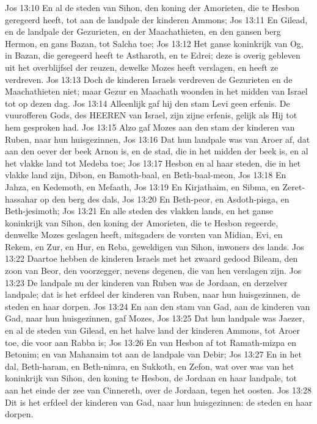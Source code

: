 Jos 13:10  En al de steden van Sihon, den koning der Amorieten, die te Hesbon geregeerd heeft, tot aan de landpale der kinderen Ammons;
Jos 13:11  En Gilead, en de landpale der Gezurieten, en der Maachathieten, en den gansen berg Hermon, en gans Bazan, tot Salcha toe;
Jos 13:12  Het ganse koninkrijk van Og, in Bazan, die geregeerd heeft te Astharoth, en te Edrei; deze is overig gebleven uit het overblijfsel der reuzen, dewelke Mozes heeft verslagen, en heeft ze verdreven.
Jos 13:13  Doch de kinderen Israels verdreven de Gezurieten en de Maachathieten niet; maar Gezur en Maachath woonden in het midden van Israel tot op dezen dag.
Jos 13:14  Alleenlijk gaf hij den stam Levi geen erfenis. De vuurofferen Gods, des HEEREN van Israel, zijn zijne erfenis, gelijk als Hij tot hem gesproken had.
Jos 13:15  Alzo gaf Mozes aan den stam der kinderen van Ruben, naar hun huisgezinnen,
Jos 13:16  Dat hun landpale was van Aroer af, dat aan den oever der beek Arnon is, en de stad, die in het midden der beek is, en al het vlakke land tot Medeba toe;
Jos 13:17  Hesbon en al haar steden, die in het vlakke land zijn, Dibon, en Bamoth-baal, en Beth-baal-meon,
Jos 13:18  En Jahza, en Kedemoth, en Mefaath,
Jos 13:19  En Kirjathaim, en Sibma, en Zeret-hassahar op den berg des dals,
Jos 13:20  En Beth-peor, en Asdoth-pisga, en Beth-jesimoth;
Jos 13:21  En alle steden des vlakken lands, en het ganse koninkrijk van Sihon, den koning der Amorieten, die te Hesbon regeerde, denwelke Mozes geslagen heeft, mitsgaders de vorsten van Midian, Evi, en Rekem, en Zur, en Hur, en Reba, geweldigen van Sihon, inwoners des lands.
Jos 13:22  Daartoe hebben de kinderen Israels met het zwaard gedood Bileam, den zoon van Beor, den voorzegger, nevens degenen, die van hen verslagen zijn.
Jos 13:23  De landpale nu der kinderen van Ruben was de Jordaan, en derzelver landpale; dat is het erfdeel der kinderen van Ruben, naar hun huisgezinnen, de steden en haar dorpen.
Jos 13:24  En aan den stam van Gad, aan de kinderen van Gad, naar hun huisgezinnen, gaf Mozes,
Jos 13:25  Dat hun landpale was Jaezer, en al de steden van Gilead, en het halve land der kinderen Ammons, tot Aroer toe, die voor aan Rabba is;
Jos 13:26  En van Hesbon af tot Ramath-mizpa en Betonim; en van Mahanaim tot aan de landpale van Debir;
Jos 13:27  En in het dal, Beth-haram, en Beth-nimra, en Sukkoth, en Zefon, wat over was van het koninkrijk van Sihon, den koning te Hesbon, de Jordaan en haar landpale, tot aan het einde der zee van Cinnereth, over de Jordaan, tegen het oosten.
Jos 13:28  Dit is het erfdeel der kinderen van Gad, naar hun huisgezinnen: de steden en haar dorpen.
